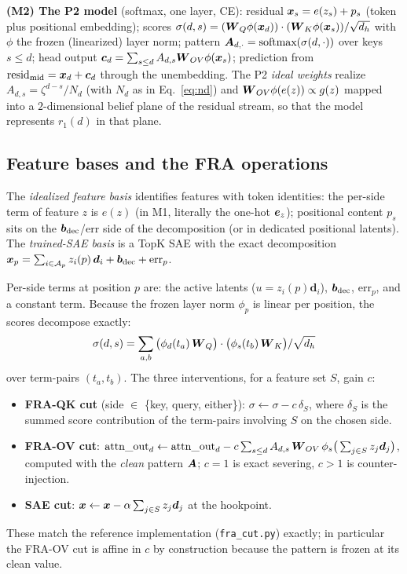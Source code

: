 \documentclass{article}
\begin{document}
\textbf{(M2) The P2 model} (softmax, one layer, CE): residual $\boldsymbol{x}_s = e(z_s) + p_s$ (token plus positional embedding); scores $\sigma(d,s) = (\boldsymbol{W}_Q\phi(\boldsymbol{x}_d))\cdot(\boldsymbol{W}_K\phi(\boldsymbol{x}_s))/\sqrt{d_h}$ with $\phi$ the frozen (linearized) layer norm; pattern $\boldsymbol{A}_{d,\cdot} = \textrm{softmax}(\sigma(d, \cdot))$ over keys $s \le d$; head output $\boldsymbol{c}_d = \sum_{s\le d} A_{d,s}\boldsymbol{W}_{OV}\phi(\boldsymbol{x}_s)$; prediction from $\mathrm{resid}_{\mathrm{mid}} = \boldsymbol{x}_d + \boldsymbol{c}_d$ through the unembedding. The P2 \emph{ideal weights} realize $A_{d,s} = \zeta^{d-s}/N_d$ (with $N_d$ as in Eq.~\eqref{eq:nd}) and $\boldsymbol{W}_{OV}\phi(e(z)) \propto g(z)$ mapped into a $2$-dimensional belief plane of the residual stream, so that the model represents $r_1(d)$ in that plane.

\subsection{Feature bases and the FRA operations}

\begin{definition}\label{def:bases}
The \emph{idealized feature basis} identifies features with token identities: the per-side term of feature $z$ is $e(z)$ (in M1, literally the one-hot $\boldsymbol{e}_z$); positional content $p_s$ sits on the $\boldsymbol{b}_{\mathrm{dec}}$/err side of the decomposition (or in dedicated positional latents). The \emph{trained-SAE basis} is a TopK SAE with the exact decomposition $\boldsymbol{x}_p = \sum_{i\in\mathcal{A}_p} z_i(p)\,\boldsymbol{d}_i + \boldsymbol{b}_{\mathrm{dec}} + \mathrm{err}_p$.
\end{definition}

\begin{definition}\label{def:fra}
Per-side terms at position $p$ are: the active latents ($u = z_i(p)\boldsymbol{d}_i$), $\boldsymbol{b}_{\mathrm{dec}}$, $\mathrm{err}_p$, and a constant term. Because the frozen layer norm $\phi_p$ is linear per position, the scores decompose exactly:
\begin{equation}\label{eq:scoredecomp}
    \sigma(d,s) = \sum_{a,b}\big(\phi_d(t_a)\,\boldsymbol{W}_Q\big)\cdot\big(\phi_s(t_b)\,\boldsymbol{W}_K\big)/\sqrt{d_h}
\end{equation}
over term-pairs $(t_a, t_b)$. The three interventions, for a feature set $S$, gain $c$:
\begin{itemize}
    \item \textbf{FRA-QK cut} (side $\in$ \{key, query, either\}): $\sigma \leftarrow \sigma - c\,\delta_S$, where $\delta_S$ is the summed score contribution of the term-pairs involving $S$ on the chosen side.
    \item \textbf{FRA-OV cut}: $\mathrm{attn\_out}_d \leftarrow \mathrm{attn\_out}_d - c\sum_{s\le d} A_{d,s}\,\boldsymbol{W}_{OV}\,\phi_s\big(\textstyle\sum_{j\in S} z_j \boldsymbol{d}_j\big)$, computed with the \emph{clean} pattern $\boldsymbol{A}$; $c = 1$ is exact severing, $c > 1$ is counter-injection.
    \item \textbf{SAE cut}: $\boldsymbol{x} \leftarrow \boldsymbol{x} - \alpha\sum_{j\in S} z_j\boldsymbol{d}_j$ at the hookpoint.
\end{itemize}
These match the reference implementation (\texttt{fra\_cut.py}) exactly; in particular the FRA-OV cut is affine in $c$ by construction because the pattern is frozen at its clean value.
\end{definition}
\end{document}
